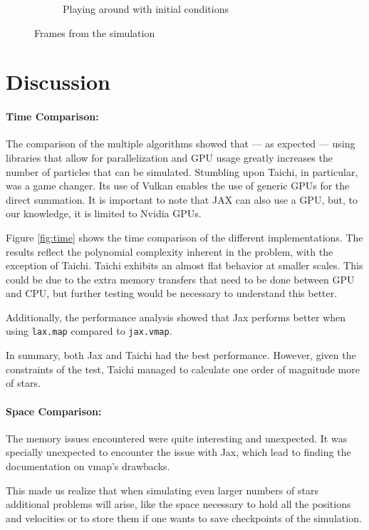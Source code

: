 \documentclass[a4paper, 11pt]{article}         %
\begin{document}
\begin{figure}
\begin{subfigure}{.5\textwidth}
  \caption{Playing around with initial conditions}
  \label{fig:space}
\end{subfigure}
\caption{Frames from the simulation}
\label{fig:test}
\end{figure}

\section{Discussion}

\paragraph{Time Comparison:}
The comparison of the multiple algorithms showed that --- as expected --- using libraries that allow for parallelization and GPU usage greatly increases the number of particles that can be simulated.  Stumbling upon Taichi, in particular, was a game changer. Its use of Vulkan enables the use of generic GPUs for the direct summation. It is important to note that JAX can also use a GPU, but, to our knowledge, it is limited to Nvidia GPUs.


Figure \ref{fig:time} shows the time comparison of the different implementations. The results reflect the polynomial complexity inherent in the problem, with the exception of Taichi. Taichi exhibits an almost flat behavior at smaller scales.
This could be due to the extra memory transfers that need to be done between GPU and CPU, but further testing would be necessary to understand this better.

Additionally, the performance analysis showed that Jax performs better when using \texttt{lax.map} compared to \texttt{jax.vmap}.

In summary, both Jax and Taichi had the best performance. However, given the constraints of the test, Taichi managed to calculate one order of magnitude more of stars.

\paragraph{Space Comparison:}
The memory issues encountered were quite interesting and unexpected. It was specially unexpected to encounter the issue with Jax, which lead to finding the documentation on vmap's drawbacks.

This made us realize that when simulating even larger numbers of stars additional problems will arise,
like the space necessary to hold all the positions and velocities or to store them if one wants to save checkpoints of the simulation.
\end{document}
